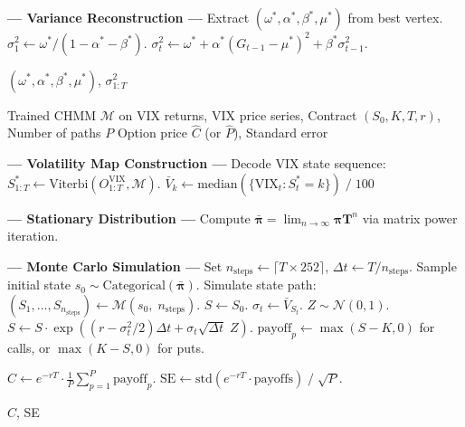 \begin{algorithm}[tp]
\begin{algorithmic}[1]
\STATE \textbf{--- Variance Reconstruction ---}
\STATE Extract $(\omega^*, \alpha^*, \beta^*, \mu^*)$ from best vertex.
\STATE $\sigma_1^2 \leftarrow \omega^* / (1 - \alpha^* - \beta^*)$.
    \STATE $\sigma_t^2 \leftarrow \omega^* + \alpha^* (G_{t-1} - \mu^*)^2 + \beta^* \sigma_{t-1}^2$.
\ENDFOR

\RETURN $(\omega^*, \alpha^*, \beta^*, \mu^*)$, $\sigma^2_{1:T}$
\end{algorithmic}
\end{algorithm}

\begin{algorithm}[tp]
\caption{CHMM regime-switching Monte Carlo option pricing}
\label{alg:chmm_pricing}
\small
\begin{algorithmic}[1]
\REQUIRE Trained CHMM $\mathcal{M}$ on VIX returns, VIX price series, Contract $(S_0, K, T, r)$, Number of paths $P$
\ENSURE Option price $\hat{C}$ (or $\hat{P}$), Standard error

\STATE \textbf{--- Volatility Map Construction ---}
\STATE Decode VIX state sequence: $S_{1:T}^* \leftarrow \text{Viterbi}(O_{1:T}^{\text{VIX}}, \mathcal{M})$.
    \STATE $\bar{V}_k \leftarrow \text{median}(\{\text{VIX}_t : S_t^* = k\}) \;/\; 100$ 
\ENDFOR

\STATE \textbf{--- Stationary Distribution ---}
\STATE Compute $\bar{\boldsymbol{\pi}} = \lim_{n \to \infty} \boldsymbol{\pi} \mathbf{T}^n$ via matrix power iteration.

\STATE \textbf{--- Monte Carlo Simulation ---}
\STATE Set $n_{\text{steps}} \leftarrow \lceil T \times 252 \rceil$, \quad $\Delta t \leftarrow T / n_{\text{steps}}$.
    \STATE Sample initial state $s_0 \sim \text{Categorical}(\bar{\boldsymbol{\pi}})$.
    \STATE Simulate state path: $(S_1, \ldots, S_{n_{\text{steps}}}) \leftarrow \mathcal{M}(s_0,\; n_{\text{steps}})$.
    \STATE $S \leftarrow S_0$.
        \STATE $\sigma_t \leftarrow \bar{V}_{S_t}$.
        \STATE $Z \sim \mathcal{N}(0,1)$.
        \STATE $S \leftarrow S \cdot \exp\!\left((r - \sigma_t^2 / 2)\Delta t + \sigma_t \sqrt{\Delta t}\; Z\right)$.
    \ENDFOR
    \STATE $\text{payoff}_p \leftarrow \max(S - K, 0)$ for calls, or $\max(K - S, 0)$ for puts.
\ENDFOR

\STATE $\hat{C} \leftarrow e^{-rT} \cdot \frac{1}{P}\sum_{p=1}^{P} \text{payoff}_p$.
\STATE $\text{SE} \leftarrow \text{std}(e^{-rT} \cdot \text{payoffs}) \;/\; \sqrt{P}$.

\RETURN $\hat{C}$, SE
\end{algorithmic}
\end{algorithm}

